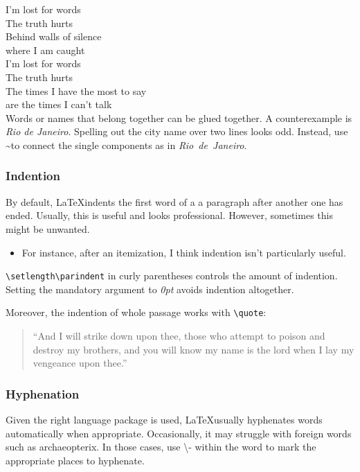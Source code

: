 \documentclass[a4paper]{scrartcl}
\begin{document}
{\setlength\parindent{0pt}
	I'm lost for words\\
	The truth hurts\\
	Behind walls of silence\\
	where I am caught \\[0.5cm]
	I'm lost for words\\
	The truth hurts\\
	The times I have the most to say\\
	are the times I can't talk
\\

Words or names that belong together can be glued together. A counterexample is \emph{Rio de Janeiro}. Spelling out the city name over two lines looks odd. Instead, use \textasciitilde \space to connect the single components as in \emph{Rio~de~Janeiro}.
}
\subsubsection{Indention}
By default, \LaTeX indents the first word of a a paragraph after another one has ended. Usually, this is useful and looks professional. However, sometimes this might be unwanted.

\begin{itemize}
	\item For instance, after an itemization, I think indention isn't particularly useful.
\end{itemize}

{\setlength\parindent{0pt}  \texttt{\textbackslash setlength\textbackslash parindent} in curly parentheses controls the amount of indention. Setting the mandatory argument to \emph{0pt} avoids indention altogether.}

Moreover, the indention of whole passage works with \texttt{\textbackslash quote}:
\begin{quote}
	``And I will strike down upon thee, those who attempt to poison and destroy my brothers, and you will know my name is the lord when I lay my vengeance upon thee.''
\end{quote}
		
	\subsubsection{Hyphenation}
	Given the right language package is used, \LaTeX \space usually hyphenates words automatically when appropriate. Occasionally, it may struggle with foreign words such as archae\-opterix. In those cases, use \textbackslash - within the word to mark the appropriate places to hyphenate.
	
\end{document}
